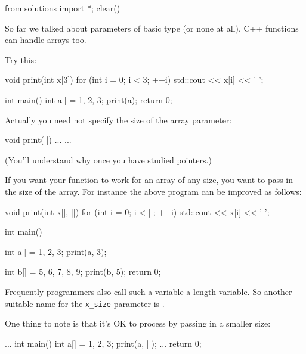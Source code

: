 \begin{python0}
from solutions import *; clear()
\end{python0}

So far we talked about parameters of basic type (or none at all). C++
functions can handle arrays too.

Try this:

\begin{consolethree}[escapeinside=||]
void print(int x[3])
{
    for (int i = 0; i < 3; ++i)
    {
        std::cout << x[i] << ' ';
    }
}

int main()
{
    int a[] = {1, 2, 3};
    print(a);
    return 0;
}
\end{consolethree}

Actually you need not specify the size of the array parameter:

\begin{consolethree}[escapeinside=||]
void print(||)
{
    ...
}
...
\end{consolethree}

(You'll understand why once you have studied pointers.)

If you want your function to work for an array of any size, you want to
pass in the size of the array. For instance the above program can be
improved as follows:

\begin{consolethree}[escapeinside=||]
void print(int x[], ||)
{
    for (int i = 0; i < ||; ++i)
    {
        std::cout << x[i] << ' ';
    }
}

int main()
{
    int a[] = {1, 2, 3};
    print(a, 3);

    int b[] = {5, 6, 7, 8, 9};
    print(b, 5);
    return 0;
}
\end{consolethree}

Frequently programmers also call such a variable a length variable. So another suitable name for the \texttt{x\_size} parameter is \texttt{}.

One  thing to note is that it's OK to process  by passing in a smaller size:

\begin{consolethree}[escapeinside=||]
...
int main()
{
    int a[] = {1, 2, 3};
    print(a, ||);
    ...
    return 0;
}
\end{consolethree}

